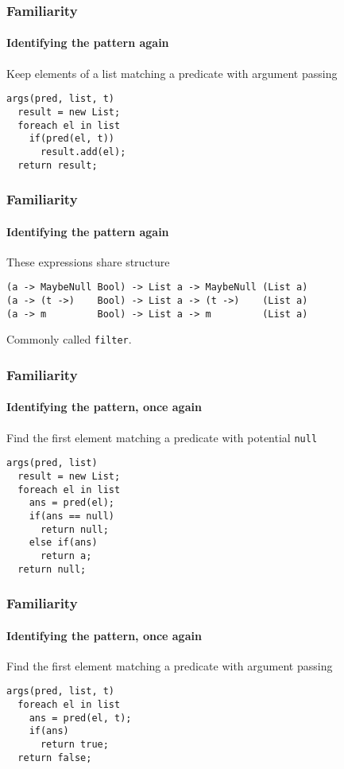 \begin{frame}[fragile]
\frametitle{Familiarity}
\framesubtitle{Identifying the pattern again}
\begin{block}{Keep elements of a list matching a predicate with argument passing}
\begin{lstlisting}[style=language]
args(pred, list, t)
  result = new List;
  foreach el in list
    if(pred(el, t))
      result.add(el);
  return result;
\end{lstlisting}
\end{block}
\end{frame}

\begin{frame}[fragile]
\frametitle{Familiarity}
\framesubtitle{Identifying the pattern again}
\begin{block}{These expressions share structure}
\begin{lstlisting}[style=language]
(a -> MaybeNull Bool) -> List a -> MaybeNull (List a)
(a -> (t ->)    Bool) -> List a -> (t ->)    (List a)
(a -> m         Bool) -> List a -> m         (List a)
\end{lstlisting}
\end{block}
Commonly called \lstinline{filter}.
\end{frame}

\begin{frame}[fragile]
\frametitle{Familiarity}
\framesubtitle{Identifying the pattern, once again}
\begin{block}{Find the first element matching a predicate with potential \lstinline{null}}
\begin{lstlisting}[style=language]
args(pred, list)
  result = new List;
  foreach el in list
    ans = pred(el);
    if(ans == null)
      return null;
    else if(ans)
      return a;
  return null;
\end{lstlisting}
\end{block}
\end{frame}

\begin{frame}[fragile]
\frametitle{Familiarity}
\framesubtitle{Identifying the pattern, once again}
\begin{block}{Find the first element matching a predicate with argument passing}
\begin{lstlisting}[style=language]
args(pred, list, t)
  foreach el in list
    ans = pred(el, t);
    if(ans)
      return true;    
  return false;
\end{lstlisting}
\end{block}
\end{frame}

